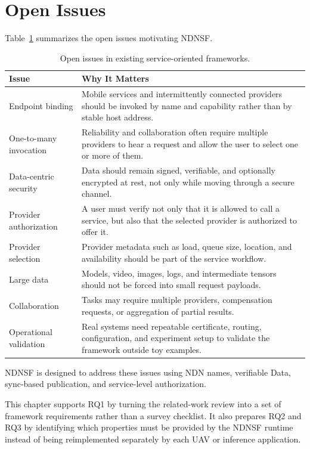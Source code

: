 \section{Open Issues}

Table~\ref{tab:framework-gaps} summarizes the open issues motivating NDNSF.

\begin{table}[H]
\centering
\caption{Open issues in existing service-oriented frameworks.}
\label{tab:framework-gaps}
\begin{tabularx}{\textwidth}{p{}X}
\toprule
Issue & Why It Matters \\
\midrule
Endpoint binding & Mobile services and intermittently connected providers
should be invoked by name and capability rather than by stable host address. \\
One-to-many invocation & Reliability and collaboration often require multiple
providers to hear a request and allow the user to select one or more of them. \\
Data-centric security & Data should remain signed, verifiable, and optionally
encrypted at rest, not only while moving through a secure channel. \\
Provider authorization & A user must verify not only that it is allowed to
call a service, but also that the selected provider is authorized to offer it. \\
Provider selection & Provider metadata such as load, queue size, location, and
availability should be part of the service workflow. \\
Large data & Models, video, images, logs, and intermediate tensors should not
be forced into small request payloads. \\
Collaboration & Tasks may require multiple providers, compensation requests,
or aggregation of partial results. \\
Operational validation & Real systems need repeatable certificate, routing,
configuration, and experiment setup to validate the framework outside toy
examples. \\
\bottomrule
\end{tabularx}
\end{table}

NDNSF is designed to address these issues using NDN names, verifiable Data,
sync-based publication, and service-level authorization.

This chapter supports RQ1 by turning the related-work review into a set of
framework requirements rather than a survey checklist. It also prepares RQ2
and RQ3 by identifying which properties must be provided by the NDNSF runtime
instead of being reimplemented separately by each UAV or inference
application.
